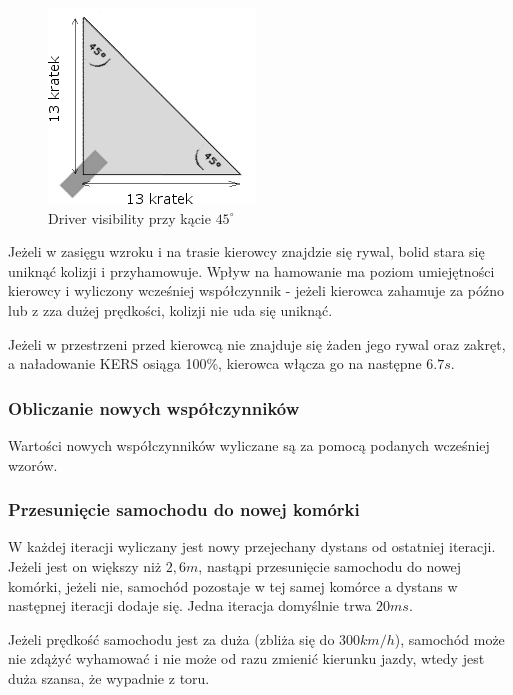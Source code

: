 \documentclass{article}
\begin{document}
\begin{figure}[h]
\begin{center}
\includegraphics[scale=0.6]{visibility-top-left.png}
\caption{Driver visibility przy kącie $45^{\circ}$}
\end{center}
\end{figure}

Jeżeli w zasięgu wzroku i na trasie kierowcy znajdzie się rywal, bolid stara się uniknąć kolizji i przyhamowuje. Wpływ na hamowanie ma poziom umiejętności kierowcy i wyliczony wcześniej współczynnik - jeżeli kierowca zahamuje za późno lub z zza dużej prędkości, kolizji nie uda się uniknąć.

Jeżeli w przestrzeni przed kierowcą nie znajduje się żaden jego rywal oraz zakręt, a naładowanie KERS osiąga 100\%, kierowca włącza go na następne $6.7 s$.



\subsubsection{Obliczanie nowych współczynników}

Wartości nowych współczynników wyliczane są za pomocą podanych wcześniej wzorów.

\subsubsection{Przesunięcie samochodu do nowej komórki}
W każdej iteracji wyliczany jest nowy przejechany dystans od ostatniej iteracji. Jeżeli jest on większy niż $2,6 m$, nastąpi przesunięcie samochodu do nowej komórki, jeżeli nie, samochód pozostaje w tej samej komórce a dystans w następnej iteracji dodaje się. Jedna iteracja domyślnie trwa $20 ms$.

Jeżeli prędkość samochodu jest za duża (zbliża się do $300 km/h$), samochód może nie zdążyć wyhamować i nie może od razu zmienić kierunku jazdy, wtedy jest duża szansa, że wypadnie z toru.
\end{document}

